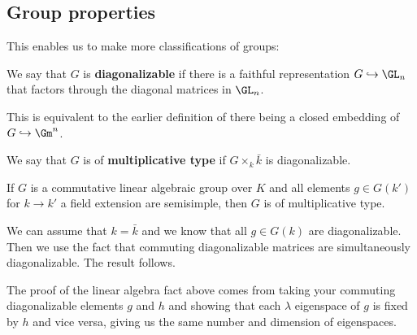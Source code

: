 \documentclass[12pt]{article}
\begin{document}
\subsection{Group properties}
This enables us to make more classifications of groups:
\begin{prop}
	We say that $G$ is \textbf{diagonalizable} if there is a faithful representation $G\hookrightarrow\GL_n$ that factors through the 
	diagonal matrices in $\GL_n$.
\end{prop}
\begin{rmk}
	This is equivalent to the earlier definition of there being a closed embedding of $G\hookrightarrow\Gm^n$.
\end{rmk}
\begin{defn}
	We say that $G$ is of \textbf{multiplicative type} if $G\times_k\bar k$ is diagonalizable.
\end{defn}

\begin{prop}
	If $G$ is a commutative linear algebraic group over $K$ and all elements $g\in G(k')$ for $k\to k'$ a field extension are semisimple, then $G$ is of multiplicative type.
\end{prop}
\begin{prf}
	We can assume that $k=\bar k$ and we know that all $g\in G(k)$ are diagonalizable. Then we use the fact that commuting diagonalizable 
	matrices are simultaneously diagonalizable. The result follows.
\end{prf}
\begin{rmk}
	The proof of the linear algebra fact above comes from taking your commuting diagonalizable elements $g$ and $h$ and showing that each 
	$\lambda$ eigenspace of $g$ is fixed by $h$ and vice versa, giving us the same number and dimension of eigenspaces.
\end{rmk}
\end{document}

